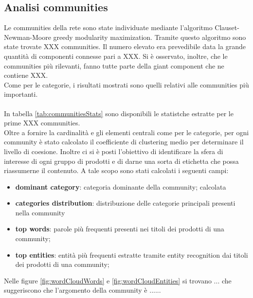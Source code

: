 \subsection{Analisi communities}
Le communities della rete sono state individuate mediante l'algoritmo Clauset-Newman-Moore greedy modularity maximization. Tramite questo algoritmo sono state trovate XXX communities. Il numero elevato era prevedibile data la grande quantità di componenti connesse pari a XXX. Si è osservato, inoltre, che le communities più rilevanti, fanno tutte parte della giant component che ne contiene XXX. \\
Come per le categorie, i risultati mostrati sono quelli relativi alle communities più importanti. 
\\\\
In tabella \ref{tab:communitiesStats} sono disponibili le statistche estratte per le prime XXX communities. \\
Oltre a fornire la cardinalità e gli elementi centrali come per le categorie, per ogni community è stato calcolato il coefficiente di clustering medio per determinare il livello di coesione.  Inoltre ci si è posti l'obiettivo di identificare la sfera di interesse di ogni gruppo di prodotti e di darne una sorta di etichetta che possa riassumerne il contenuto. A tale scopo sono stati calcolati i seguenti campi:
\begin{itemize}
    \item \textbf{dominant category}: categoria dominante della community; calcolata %
    \item \textbf{categories distribution}: distribuzione delle categorie principali presenti nella community
    \item \textbf{top words}: parole più frequenti presenti nei titoli dei prodotti di una community; %
    \item \textbf{top entities}: entità più frequenti estratte tramite entity recognition dai titoli dei prodotti di una community; %
\end{itemize}
Nelle figure \ref{fig:wordCloudWords} e \ref{fig:wordCloudEntities} si trovano ... che suggeriscono che l'argomento della community è ...... \\\\
